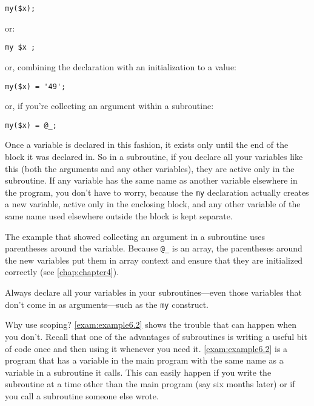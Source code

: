 \begin{lstlisting}
my($x); 
\end{lstlisting}

or:

\begin{lstlisting}
my $x ; 
\end{lstlisting}

or, combining the declaration with an initialization to a value:

\begin{lstlisting}
my($x) = '49'; 
\end{lstlisting}

or, if you're collecting an argument within a subroutine:

\begin{lstlisting}
my($x) = @_; 
\end{lstlisting}

Once a variable is declared in this fashion, it exists only until the end of the block it was declared in. So in a subroutine, if you declare all your variables like this (both the arguments and any other variables), they are active only in the subroutine. If any variable has the same name as another variable elsewhere in the program, you don't have to worry, because the \verb|my| declaration actually creates a new variable, active only in the enclosing block, and any other variable of the same name used elsewhere outside the block is kept separate.

The example that showed collecting an argument in a subroutine uses parentheses around the variable. Because \verb|@_| is an array, the parentheses around the new variables put them in array context and ensure that they are initialized correctly (see \autoref{chap:chapter4}).

\begin{adjustwidth}{2cm}{2cm}
  Always declare all your variables in your subroutines—even those variables that don't come in as arguments—such as the \verb|my| construct. 
\end{adjustwidth}

Why use scoping? \autoref{exam:example6.2} shows the trouble that can happen when you don't. Recall that one of the advantages of subroutines is writing a useful bit of code once and then using it whenever you need it. \autoref{exam:example6.2} is a program that has a variable in the main program with the same name as a variable in a subroutine it calls. This can easily happen if you write the subroutine at a time other than the main program (say six months later) or if you call a subroutine someone else wrote. 

